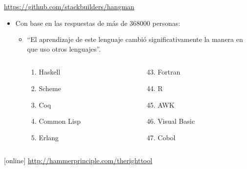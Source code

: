 \documentclass[spanish]{beamer}
\begin{document}

\begin{frame}
  \begin{center}
    \url{https://github.com/stackbuilders/hangman}
  \end{center}
\end{frame}


\begin{frame}
  \begin{itemize}
  \item
    Con base en las respuestas de más de 368000 personas:
    \begin{itemize}
    \item
      ``El aprendizaje de este lenguaje cambió significativamente la
      manera en que uso otros lenguajes''.
      \begin{columns}[T]
        \begin{column}{3cm}
          \begin{enumerate}
          \item Haskell
          \item Scheme
          \item Coq
          \item Common Lisp
          \item Erlang
          \end{enumerate}
        \end{column}
        \begin{column}{3cm}
          \begin{enumerate}
          \setcounter{enumi}{42}
          \item Fortran
          \item R
          \item AWK
          \item Visual Basic
          \item Cobol
          \end{enumerate}
        \end{column}
      \end{columns}
    \end{itemize}
  \end{itemize}
  \begin{thebibliography}{}
  [online]
    \newblock \url{http://hammerprinciple.com/therighttool}
  \end{thebibliography}
\end{frame}
\end{document}
